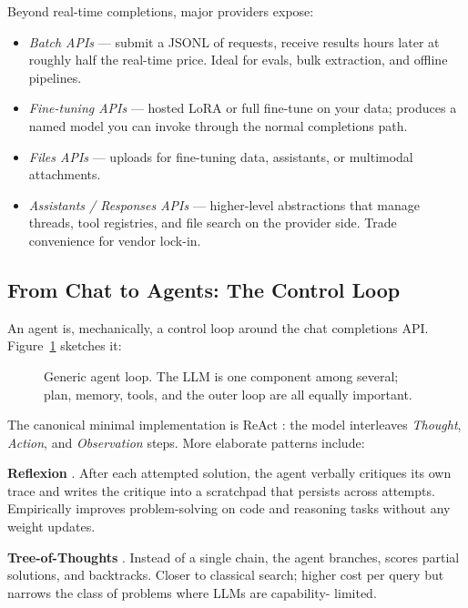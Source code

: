Beyond real-time completions, major providers expose:
\begin{itemize}
  \item \emph{Batch APIs} --- submit a JSONL of requests, receive
        results hours later at roughly half the real-time price.
        Ideal for evals, bulk extraction, and offline pipelines.
  \item \emph{Fine-tuning APIs} --- hosted LoRA or full fine-tune
        on your data; produces a named model you can invoke
        through the normal completions path.
  \item \emph{Files APIs} --- uploads for fine-tuning data,
        assistants, or multimodal attachments.
  \item \emph{Assistants / Responses APIs} --- higher-level
        abstractions that manage threads, tool registries, and
        file search on the provider side. Trade convenience for
        vendor lock-in.
\end{itemize}

\subsection{From Chat to Agents: The Control Loop}

An agent is, mechanically, a control loop around the chat
completions API. Figure~\ref{fig:agent_loop} sketches it:

\begin{figure}[H]
  \centering
  
  \caption{Generic agent loop. The LLM is one component among
           several; plan, memory, tools, and the outer loop are
           all equally important.}
  \label{fig:agent_loop}
\end{figure}

The canonical minimal implementation is ReAct
\citep{yao2023react}: the model interleaves \emph{Thought},
\emph{Action}, and \emph{Observation} steps. More elaborate
patterns include:

\textbf{Reflexion} \citep{shinn2023reflexion}. After each
attempted solution, the agent verbally critiques its own trace
and writes the critique into a scratchpad that persists across
attempts. Empirically improves problem-solving on code and
reasoning tasks without any weight updates.

\textbf{Tree-of-Thoughts} \citep{yao2023tree}. Instead of a
single chain, the agent branches, scores partial solutions, and
backtracks. Closer to classical search; higher cost per query
but narrows the class of problems where LLMs are capability-
limited.

